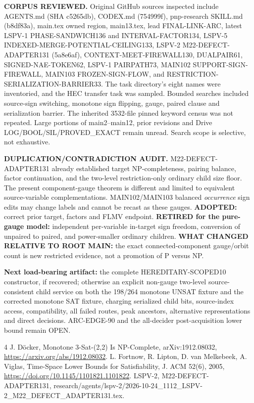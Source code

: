 \documentclass[11pt]{article}
\begin{document}
\textbf{CORPUS REVIEWED.} Original GitHub sources inspected
include AGENTS.md (SHA c5265db), CODEX.md (754999f),
pnp-research SKILL.md (b8df83a), main.tex owned region,
main13.tex, lead FINAL-LINK-ARC, latest LSPV-1
PHASE-SANDWICH136 and INTERVAL-FACTOR134,
LSPV-5 INDEXED-MERGE-POTENTIAL-CEILING133,
LSPV-2 M22-DEFECT-ADAPTER131 (5a8e6af),
CONTEXT-MEET-FIREWALL130, DUALPAIR61,
SIGNED-NAE-TOKEN62, LSPV-1 PAIRPATH73,
MAIN102 SUPPORT-SIGN-FIREWALL, MAIN103
FROZEN-SIGN-FLOW, and RESTRICTION-SERIALIZATION-BARRIER33.
The task directory's eight names were inventoried,
and the HEC transfer task was sampled.
Bounded searches included source-sign switching,
monotone sign flipping, gauge, paired clause and
serialization barrier. The inherited 3532-file
pinned keyword census was not repeated.
Large portions of main2--main12, prior revisions
and Drive LOG/BOOL/SIL/PROVED_EXACT remain unread.
Search scope is selective, not exhaustive.

\textbf{DUPLICATION/CONTRADICTION AUDIT.}
M22-DEFECT-ADAPTER131 already established target
NP-completeness, pairing balance, factor continuation,
and the two-level restriction-only ordinary child size floor.
The present component-gauge theorem is different and
limited to equivalent source-variable complementations.
MAIN102/MAIN103 balanced \emph{occurrence} sign edits
may change labels and cannot be recast as these gauges.
\textbf{ADOPTED:} correct prior target, factors and
FLMV endpoint. \textbf{RETIRED for the pure-gauge
model:} independent per-variable in-target sign
freedom, conversion of unpaired to paired, and
power-smaller ordinary children.
\textbf{WHAT CHANGED RELATIVE TO ROOT MAIN:}
the exact connected-component gauge/orbit count is
new restricted evidence, not a promotion of P versus NP.

\textbf{Next load-bearing artifact:} the complete
HEREDITARY-SCOPED10 constructor, if recovered; otherwise
an explicit non-gauge two-level source-consistent child
service on both the 198/264 monotone UNSAT fixture
and the corrected monotone SAT fixture, charging
serialized child bits, source-index access, compatibility,
all failed routes, peak ancestors, alternative representations
and direct decisions. ARC-EDGE-90 and the
all-decider post-acquisition lower bound remain OPEN.

\begin{thebibliography}{4}
 J. D\"ocker, Monotone 3-Sat-(2,2) Is
NP-Complete, arXiv:1912.08032,
\url{https://arxiv.org/abs/1912.08032}.
 L. Fortnow, R. Lipton, D. van Melkebeek,
A. Viglas, Time-Space Lower Bounds for Satisfiability,
J. ACM 52(6), 2005,
\url{https://doi.org/10.1145/1101821.1101822}.
 LSPV-2, M22-DEFECT-ADAPTER131,
research/agents/lspv-2/2026-10-24\_1112\_LSPV-2\_M22\_DEFECT\_ADAPTER131.tex.
\end{thebibliography}
\end{document}
